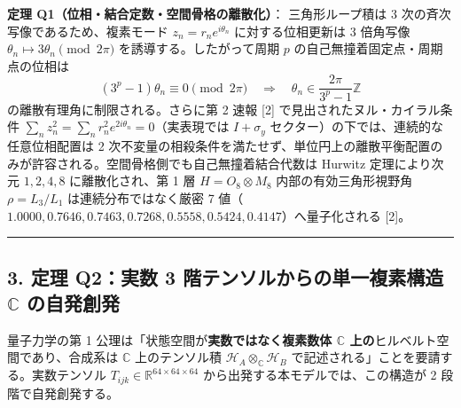 \documentclass[
  a4paper,
]{ltjsarticle}
\begin{document}
\textbf{定理 Q1（位相・結合定数・空間骨格の離散化）}： 三角形ループ積は
3 次の斉次写像であるため、複素モード \(z_n = r_n e^{i\theta_n}\)
に対する位相更新は 3 倍角写像 \(\theta_n \mapsto 3\theta_n \pmod{2\pi}\)
を誘導する。したがって周期 \(p\) の自己無撞着固定点・周期点の位相は
\[(3^p - 1)\theta_n \equiv 0 \pmod{2\pi} \quad \Longrightarrow \quad \theta_n \in \frac{2\pi}{3^p - 1}\mathbb{Z}\]
の離散有理角に制限される。さらに第 2 速報 {[}2{]}
で見出されたヌル・カイラル条件
\(\sum_n z_n^2 = \sum_n r_n^2 e^{2i\theta_n} = 0\)（実表現では
\(I + \sigma_y\) セクター）の下では、連続的な任意位相配置は 2
次不変量の相殺条件を満たせず、単位円上の離散平衡配置のみが許容される。空間骨格側でも自己無撞着結合代数は
Hurwitz 定理により次元 \(1, 2, 4, 8\) に離散化され、第 1 層
\(H = O_8 \otimes M_8\) 内部の有効三角形視野角 \(\rho = L_3 / L_1\)
は連続分布ではなく厳密 7
値（\(1.0000, 0.7646, 0.7463, 0.7268, 0.5558, 0.5424, 0.4147\)）へ量子化される
{[}2{]}。

\begin{center}\rule{0.5\linewidth}{0.5pt}\end{center}

\subsection{\texorpdfstring{3. 定理 Q2：実数 3
階テンソルからの単一複素構造 \(\mathbb{C}\)
の自発創発}{3. 定理 Q2：実数 3 階テンソルからの単一複素構造 \textbackslash mathbb\{C\} の自発創発}}\label{ux5b9aux7406-q2ux5b9fux6570-3-ux968eux30c6ux30f3ux30bdux30ebux304bux3089ux306eux5358ux4e00ux8907ux7d20ux69cbux9020-mathbbc-ux306eux81eaux767aux5275ux767a}

量子力学の第 1 公理は「状態空間が\textbf{実数ではなく複素数体
\(\mathbb{C}\) 上の}ヒルベルト空間であり、合成系は \(\mathbb{C}\)
上のテンソル積 \(\mathcal{H}_A \otimes_{\mathbb{C}} \mathcal{H}_B\)
で記述される」ことを要請する。実数テンソル
\(T_{ijk} \in \mathbb{R}^{64\times 64\times 64}\)
から出発する本モデルでは、この構造が 2 段階で自発創発する。
\end{document}
